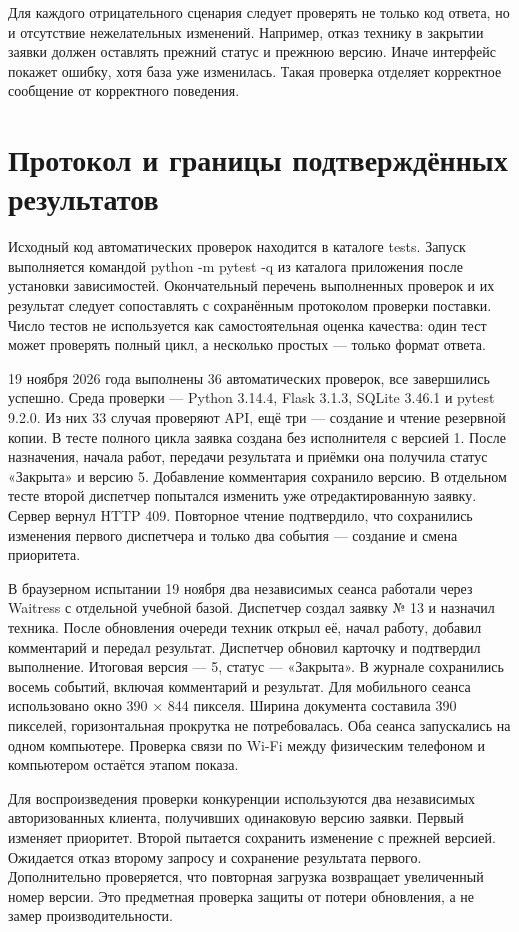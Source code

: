 \documentclass{timcw}
\begin{document}
Для каждого отрицательного сценария следует проверять не только код ответа, но и отсутствие нежелательных изменений. Например, отказ технику в закрытии заявки должен оставлять прежний статус и прежнюю версию. Иначе интерфейс покажет ошибку, хотя база уже изменилась. Такая проверка отделяет корректное сообщение от корректного поведения.

\section{Протокол и границы подтверждённых результатов}

Исходный код автоматических проверок находится в каталоге tests. Запуск выполняется командой python -m pytest -q из каталога приложения после установки зависимостей. Окончательный перечень выполненных проверок и их результат следует сопоставлять с сохранённым протоколом проверки поставки. Число тестов не используется как самостоятельная оценка качества: один тест может проверять полный цикл, а несколько простых — только формат ответа.

19 ноября 2026 года выполнены 36 автоматических проверок, все завершились успешно. Среда проверки — Python 3.14.4, Flask 3.1.3, SQLite 3.46.1 и pytest 9.2.0. Из них 33 случая проверяют API, ещё три — создание и чтение резервной копии. В тесте полного цикла заявка создана без исполнителя с версией 1. После назначения, начала работ, передачи результата и приёмки она получила статус «Закрыта» и версию 5. Добавление комментария сохранило версию. В отдельном тесте второй диспетчер попытался изменить уже отредактированную заявку. Сервер вернул HTTP 409. Повторное чтение подтвердило, что сохранились изменения первого диспетчера и только два события — создание и смена приоритета.

В браузерном испытании 19 ноября два независимых сеанса работали через Waitress с отдельной учебной базой. Диспетчер создал заявку № 13 и назначил техника. После обновления очереди техник открыл её, начал работу, добавил комментарий и передал результат. Диспетчер обновил карточку и подтвердил выполнение. Итоговая версия — 5, статус — «Закрыта». В журнале сохранились восемь событий, включая комментарий и результат. Для мобильного сеанса использовано окно 390 × 844 пикселя. Ширина документа составила 390 пикселей, горизонтальная прокрутка не потребовалась. Оба сеанса запускались на одном компьютере. Проверка связи по Wi-Fi между физическим телефоном и компьютером остаётся этапом показа.

Для воспроизведения проверки конкуренции используются два независимых авторизованных клиента, получивших одинаковую версию заявки. Первый изменяет приоритет. Второй пытается сохранить изменение с прежней версией. Ожидается отказ второму запросу и сохранение результата первого. Дополнительно проверяется, что повторная загрузка возвращает увеличенный номер версии. Это предметная проверка защиты от потери обновления, а не замер производительности.
\end{document}
